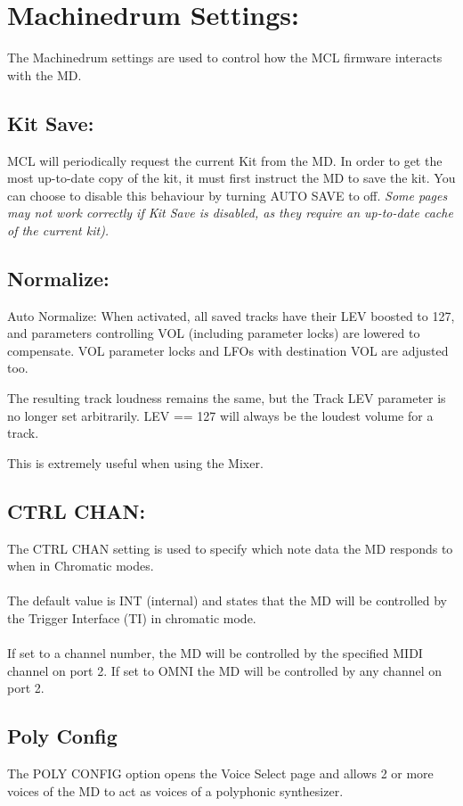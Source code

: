 \chapter{Machinedrum Settings:}
The Machinedrum settings are used to control how the MCL firmware interacts with the MD.
\\
\section{Kit Save:}
MCL will periodically request the current Kit from the MD. In order to get the most up-to-date copy of the kit, it must first instruct the MD to save the kit. You can choose to disable this behaviour by turning AUTO SAVE to off. \textit{Some pages may not work correctly if Kit Save is disabled, as they require an up-to-date cache of the current kit).}
\section{Normalize:}
Auto Normalize: When activated,  all saved tracks have their LEV boosted to
127, and parameters controlling VOL (including parameter locks) are lowered
to compensate. VOL parameter locks and LFOs with destination VOL are 
adjusted too.

The resulting track loudness remains the same, but the Track LEV parameter
is no longer set arbitrarily. LEV == 127 will always be the loudest volume
for a track.

This is extremely useful when using the Mixer.
\section{CTRL CHAN:}
The CTRL CHAN setting is used to specify which note data the MD responds to when in Chromatic modes. \\\\The default value is INT (internal) and states that the MD will be controlled by the Trigger Interface (TI) in chromatic mode. \\
\\If set to a channel number, the MD will be controlled by the specified MIDI channel on port 2. If set to OMNI the MD will be controlled by any channel on port 2.
\section{Poly Config}
The POLY CONFIG option opens the Voice Select page and allows 2 or more voices of the MD to act as voices of a polyphonic synthesizer.
